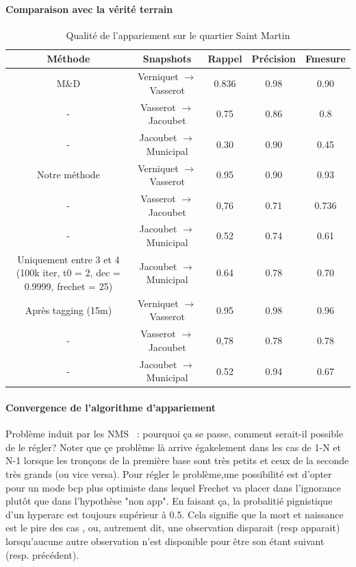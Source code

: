 \documentclass[a4paper,12pt]{article}
\begin{document}
\paragraph{Comparaison avec la vérité terrain}
\begin{table}
\caption{Qualité de l'appariement sur le quartier Saint Martin}
\begin{tabular}{c|c|c|c|c|}
Méthode & Snapshots & Rappel & Précision & Fmesure \\ \hline
M\&D & Verniquet $\to$ Vasserot &  0.836 & 0.98 & 0.90 \\ \hline
- & Vasserot $\to$ Jacoubet &  0.75 & 0.86 & 0.8 \\ \hline
- & Jacoubet $\to$ Municipal &  0.30 & 0.90 & 0.45 \\ \hline
\hline
Notre méthode & Verniquet $\to$ Vasserot &  0.95 & 0.90 & 0.93 \\ \hline
- & Vasserot $\to$ Jacoubet &  0,76 & 0.71 & 0.736 \\ \hline
- & Jacoubet $\to$ Municipal & 0.52 & 0.74 & 0.61 \\ \hline
\hline
Uniquement entre 3 et 4 (100k iter, t0 = 2, dec = 0.9999, frechet = 25)& Jacoubet $\to$ Municipal &  0.64 & 0.78 & 0.70 \\ \hline
\hline
Après tagging (15m) & Verniquet $\to$ Vasserot &  0.95 & 0.98 & 0.96 \\ \hline
- & Vasserot $\to$ Jacoubet &  0,78 & 0.78 & 0.78 \\ \hline
- & Jacoubet $\to$ Municipal & 0.52 & 0.94 & 0.67 \\ \hline
\hline

\end{tabular}
\end{table}


\paragraph{Convergence de l'algorithme d'appariement}
Problème induit par les NMS ~: pourquoi ça se passe, comment serait-il possible de le régler? Noter que çe problème là arrive égakelement dans les cas de 1-N et N-1 lorsque les tronçons de la première base sont très petits et ceux de la seconde très grands (ou vice versa). Pour régler le problème,une possibilité est d'opter pour un mode bcp plus optimiste dans lequel Frechet va placer dans l'ignorance plutôt que dans l'hypothèse "non app". En faisant ça, la probalitié pignistique d'un hyperarc est toujours supérieur à 0.5. Cela signifie que la mort et naissance est le pire des cas , ou, autrement dit, une observation disparait (resp apparait) lorsqu'aucune autre observation n'est disponible pour être son étant suivant (resp. précédent).
\end{document}

